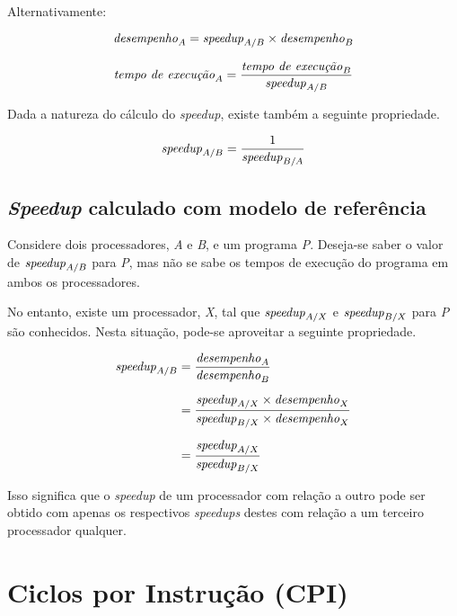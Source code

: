 \documentclass[12pt]{article}
\newcommand{\Text}[1]{\textrm{\textit{#1}}}
\begin{document}
Alternativamente:

\[ \Text{desempenho}_A = \Text{speedup}_{A/B} \times \Text{desempenho}_B \]

\[
  \Text{tempo de execução}_A
  = \frac{\Text{tempo de execução}_B}{\Text{speedup}_{A/B}}
\]

Dada a natureza do cálculo do \textit{speedup}, existe também a seguinte propriedade.

\[ \Text{speedup}_{A/B} = \frac{1}{\Text{speedup}_{B/A}} \]


\subsection{\textit{Speedup} calculado com modelo de referência}

Considere dois processadores, \textit{A} e \textit{B}, e um programa \textit{P}. Deseja-se saber o valor de \( \Text{speedup}_{A/B} \) para \textit{P}, mas não se sabe os tempos de execução do programa em ambos os processadores.

No entanto, existe um processador, \textit{X}, tal que \( \Text{speedup}_{A/X} \) e \( \Text{speedup}_{B/X} \) para \textit{P} são conhecidos. Nesta situação, pode-se aproveitar a seguinte propriedade.

\begin{align*}
  \Text{speedup}_{A/B}
  &= \frac{\Text{desempenho}_A}{\Text{desempenho}_B} \\[\medskipamount]
  &= \frac{
      \Text{speedup}_{A/X} \times \Text{desempenho}_X
    }{
      \Text{speedup}_{B/X} \times \Text{desempenho}_X
    } \\[\medskipamount]
  &= \frac{\Text{speedup}_{A/X}}{\Text{speedup}_{B/X}}
\end{align*}


Isso significa que o \textit{speedup} de um processador com relação a outro pode ser obtido com apenas os respectivos \textit{speedups} destes com relação a um terceiro processador qualquer.


\section{Ciclos por Instrução (CPI)}
\end{document}
